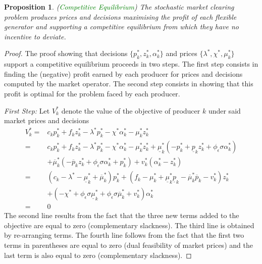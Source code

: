 \documentclass{article}
\newtheorem{proposition}{Proposition}
\begin{document}
\begin{proposition}
(\textcolor{green}{Competitive Equilibrium}) The stochastic market clearing problem produces prices and decisions maximising the profit of each flexible generator and supporting a competitive equilibrium from which they have no incentive to deviate.
\end{proposition}
\begin{proof}
The proof showing that decisions $\{p_k^*, z_k^*, \alpha_k^*\}$ and prices $\{\lambda^*, \chi^*, \mu_k^*\}$ support a competitive equilibrium proceeds in two steps. The first step consists in finding the (negative) profit earned by each producer for prices and decisions computed by the market operator. The second step consists in showing that this profit is optimal for the problem faced by each producer.

\textit{First Step:} Let $V_k^*$ denote the value of the objective of producer $k$ under said market prices and decisions
\begin{align}
    V_k^* =& c_k p_k^* + f_k z_k^* - \lambda^* p_k^* - \chi^* \alpha_k^* - \mu_k^* z_k^* \\
    =& c_k p_k^* + f_k z_k^* - \lambda^* p_k^* - \chi^* \alpha_k^* - \mu_k^* z_k^* + \underline{\mu}_k^*(-p_k^*  + \underline{p}_k z_k^* + \phi_{\epsilon} \sigma \alpha_k^*)\\
    & + \overline{\mu}_k^* (-\overline{p}_k z_k^* + \phi_{\epsilon} \sigma \alpha_k^* + p_k^*) + v_k^*(\alpha_k^* - z_k^*)\\
    =& (c_k - \lambda^* - \underline{\mu}_k^* + \overline{\mu}_k^*) p_k^*+ (f_k - \mu_k^* + \underline{\mu}_k^* \underline{p}_k - \overline{\mu}_k^* \overline{p}_k - v_k^*) z_k^*\\
    &+ (-\chi^* + \phi_{\epsilon} \sigma \underline{\mu}_k^* + \phi_{\epsilon} \sigma \overline{\mu}_k^* + v_k^*) \alpha_k^*\\
    =& 0
\end{align}
The second line results from the fact that the three new terms added to the objective are equal to zero (complementary slackness). The third line is obtained by re-arranging terms. The fourth line follows from the fact that the first two terms in parentheses are equal to zero (dual feasibility of market prices) and the last term is also equal to zero (complementary slackness).


\end{proof}
\end{document}
